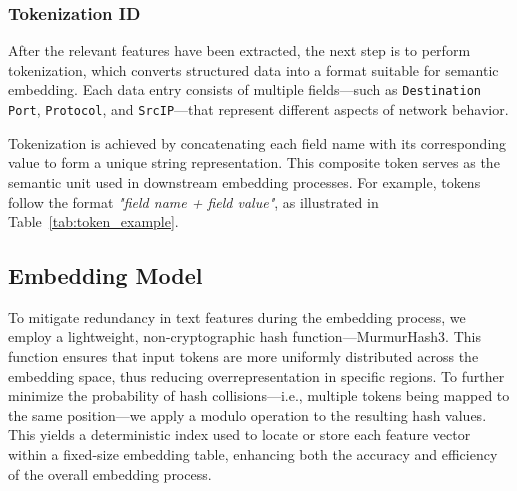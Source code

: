 \begin{ZhChapter}
    \subsubsection{Tokenization ID}
    After the relevant features have been extracted, the next step is to perform tokenization, which converts structured data into a format suitable for semantic embedding. Each data entry consists of multiple fields—such as \texttt{Destination Port}, \texttt{Protocol}, and \texttt{SrcIP}—that represent different aspects of network behavior.

    Tokenization is achieved by concatenating each field name with its corresponding value to form a unique string representation. This composite token serves as the semantic unit used in downstream embedding processes. For example, tokens follow the format \textit{"field name + field value"}, as illustrated in Table~\ref{tab:token_example}.


    \begin{table}[htbp]
        \centering
        \caption{Example of Tokenized Input Fields} \label{tab:token_example}
    \end{table}



    \subsection{Embedding Model}
    To mitigate redundancy in text features during the embedding process, we employ a lightweight, non-cryptographic hash function—MurmurHash3. This function ensures that input tokens are more uniformly distributed across the embedding space, thus reducing overrepresentation in specific regions. To further minimize the probability of hash collisions—i.e., multiple tokens being mapped to the same position—we apply a modulo operation to the resulting hash values. This yields a deterministic index used to locate or store each feature vector within a fixed-size embedding table, enhancing both the accuracy and efficiency of the overall embedding process.


\end{ZhChapter}
